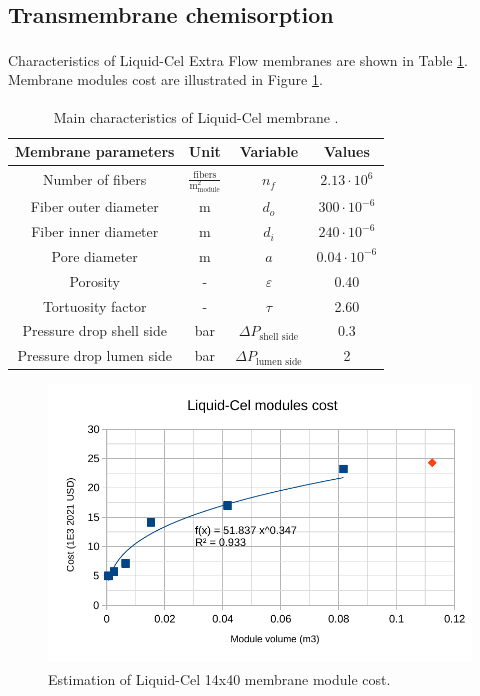 \begin{refsection}[referencesApD]
\subsection{Transmembrane chemisorption}
Characteristics of Liquid-Cel\textsuperscript{\texttrademark} Extra Flow membranes are shown in Table \ref{table:membrane_characteristichs}. Membrane modules cost are illustrated in Figure \ref{fig:MembranesCostNitrogenSM}.

\begin{table}[h] 
	\centering
	\caption{Main characteristics of Liquid-Cel \textsuperscript{\texttrademark} membrane \protect\citep{rongwong2020modelin, ulbricht2013ammoni}.} \label{table:membrane_characteristichs}
	\begin{tabular}{@{}cccc@{}}
		\toprule
		Membrane parameters  & Unit & Variable & Values  \\ \midrule
		Number of fibers     & $\frac{\text{fibers}}{\text{m}^2_{\text{module}}}$    & $n_f$       & $2.13 \cdot 10^6$    \\
		Fiber outer diameter & m    & $d_o$       & $300 \cdot 10^{-6}$  \\
		Fiber inner diameter & m    & $d_i$       & $240 \cdot 10^{-6}$  \\
		Pore diameter        & m    & $a$         & $0.04 \cdot 10^{-6}$ \\
		Porosity             & -    & $\varepsilon$  & 0.40     \\
		Tortuosity factor    & -    & $\tau$      & 2.60     \\
		Pressure drop shell side    & bar    & $\Delta P_{\text{shell side}}$      & 0.3     \\
		Pressure drop lumen side    & bar    & $\Delta P_{\text{lumen side}}$      & 2     \\
		\bottomrule
	\end{tabular}
\end{table}

\begin{figure}[h!]
	\centering
	\includegraphics[width=0.6\linewidth, trim={0cm 0cm 0cm 0cm},clip]{gfx/AppendixD/MembranesCost.pdf} 
	\caption{Estimation of Liquid-Cel\textsuperscript{\texttrademark} 14x40 membrane module cost.}
	\label{fig:MembranesCostNitrogenSM}
\end{figure}


\end{refsection}
